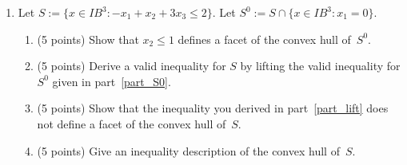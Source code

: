 \documentclass[12pt]{article}
\begin{document}
\begin{enumerate}
  \newpage
  \setcounter{page}{2}  \quad \vspace*{\fill}  \quad
  \newpage
\item
  Let $S:= \{ x \in I\!\!B^3: -x_1+x_2+3x_3 \leq 2\}$.
Let $S^0:=S \cap \{ x \in I\!\!B^3: x_1=0\}$.
\begin{enumerate}
\item (5 points) Show that $x_2 \leq 1$ defines a facet of the convex
hull of~$S^0$.
\label{part_S0}
\item \label{part_lift}
(5 points) Derive a valid inequality for $S$ by lifting the
valid inequality for $S^0$ given in part~\ref{part_S0}.
\item (5 points) Show that the inequality you derived in
part~\ref{part_lift} does not define a facet of the convex
hull of~$S$.
\item (5 points) Give an inequality description of the convex
hull of~$S$.
\end{enumerate}
  \newpage
  \setcounter{page}{3}  \quad \vspace*{\fill}  \quad

\end{enumerate}
\end{document}
